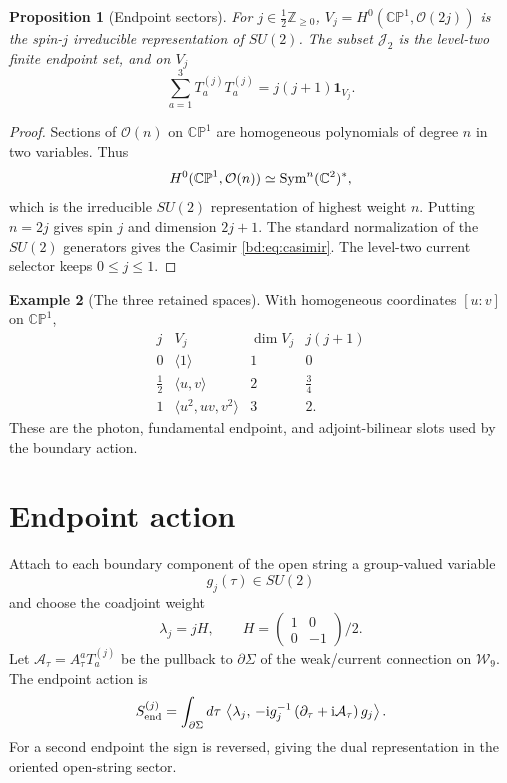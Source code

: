 \documentclass[11pt]{article}
\newcommand{\CP}{\mathbb{CP}}
\newcommand{\ZZ}{\mathbb{Z}}
\newcommand{\CC}{\mathbb{C}}
\newcommand{\JJ}{\mathcal{J}}
\newcommand{\WW}{\mathcal{W}}
\newcommand{\OO}{\mathcal{O}}
\newcommand{\ii}{\mathrm{i}}
\theoremstyle{plain}
\newtheorem{proposition}{Proposition}[section]
\theoremstyle{definition}
\newtheorem{example}[proposition]{Example}
\begin{document}
\begin{proposition}[Endpoint sectors]
\label{bd:prop:endpoint-sectors}
For \(j\in\frac12\ZZ_{\ge0}\), \(V_j=H^0(\CP^1,\OO(2j))\) is the spin-\(j\)
irreducible representation of \(SU(2)\).  The subset \(\JJ_2\) is the
level-two finite endpoint set, and on \(V_j\)
\[
  \sum_{a=1}^3T_a^{(j)}T_a^{(j)}=j(j+1)\mathbf 1_{V_j}.
  \label{bd:eq:casimir}
\]
\end{proposition}

\begin{proof}
Sections of \(\OO(n)\) on \(\CP^1\) are homogeneous polynomials of degree
\(n\) in two variables.  Thus
\[
  H^0(\CP^1,\OO(n))\simeq {\rm Sym}^n(\CC^2)^*,
\]
which is the irreducible \(SU(2)\) representation of highest weight \(n\).
Putting \(n=2j\) gives spin \(j\) and dimension \(2j+1\).  The standard
normalization of the \(SU(2)\) generators gives the Casimir
\eqref{bd:eq:casimir}.  The level-two current selector keeps \(0\le j\le1\).
\end{proof}

\begin{example}[The three retained spaces]
\label{bd:ex:three-spaces}
With homogeneous coordinates \([u:v]\) on \(\CP^1\),
\[
\begin{array}{c|c|c|c}
j & V_j & \dim V_j & j(j+1)\\
\hline
0 & \langle 1\rangle & 1 & 0\\
\frac12 & \langle u,v\rangle & 2 & \frac34\\
1 & \langle u^2,uv,v^2\rangle & 3 & 2 .
\end{array}
\]
These are the photon, fundamental endpoint, and adjoint-bilinear slots used by
the boundary action.
\end{example}

\section{Endpoint action}
\label{bd:sec:endpoint-action}

Attach to each boundary component of the open string a group-valued variable
\[
  g_j(\tau)\in SU(2)
\]
and choose the coadjoint weight
\[
  \lambda_j=jH,\qquad H=\begin{pmatrix}1&0\\0&-1\end{pmatrix}/2 .
\]
Let \(\mathcal A_\tau=A_\tau^aT_a^{(j)}\) be the pullback to
\(\partial\Sigma\) of the weak/current connection on \(\WW_9\).  The endpoint
action is
\begin{equation}
  S_{\rm end}^{(j)}
  =
  \int_{\partial\Sigma}
  d\tau\,
  \left\langle
  \lambda_j,\,
  -\ii g_j^{-1}\left(\partial_\tau+\ii\mathcal A_\tau\right)g_j
  \right\rangle .
  \label{bd:eq:endpoint-action}
\end{equation}
For a second endpoint the sign is reversed, giving the dual representation in
the oriented open-string sector.
\end{document}
